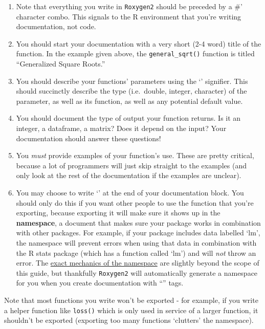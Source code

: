 \documentclass[]{book}
\begin{document}
\begin{enumerate}
\def\labelenumi{\arabic{enumi}.}
\item
  Note that everything you write in \texttt{Roxygen2} should be preceded
  by a \#' character combo. This signals to the R environment that
  you're writing documentation, not code.
\item
  You should start your documentation with a very short (2-4 word) title
  of the function. In the example given above, the
  \texttt{general\_sqrt()} function is titled ``Generalized Square
  Roots.''
\item
  You should describe your functions' parameters using the
  `\citet{param}' signifier. This should succinctly describe the type
  (i.e.~double, integer, character) of the parameter, as well as its
  function, as well as any potential default value.
\item
  You should document the type of output your function returns. Is it an
  integer, a dataframe, a matrix? Does it depend on the input? Your
  documentation should answer these questions!
\item
  You \emph{must} provide examples of your function's use. These are
  pretty critical, because a lot of programmers will just skip straight
  to the examples (and only look at the rest of the documentation if the
  examples are unclear).
\item
  You may choose to write `\citet{export}' at the end of your
  documentation block. You should only do this if you want other people
  to use the function that you're exporting, because exporting it will
  make sure it shows up in the \textbf{namespace}, a document that makes
  sure your package works in combination with other packages. For
  example, if your package includes data labelled `lm', the namespace
  will prevent errors when using that data in combination with the R
  stats package (which has a function called `lm') and will \emph{not}
  throw an error. The
  \href{http://r-pkgs.had.co.nz/namespace.html}{exact mechanics of the
  namespace} are slightly beyond the scope of this guide, but thankfully
  \texttt{Roxygen2} will automatically generate a namespace for you when
  you create documentation with ``\citet{export}'' tags.
\end{enumerate}

Note that most functions you write won't be exported - for example, if
you write a helper function like \texttt{loss()} which is only used in
service of a larger function, it shouldn't be exported (exporting too
many functions `clutters' the namespace).
\end{document}
